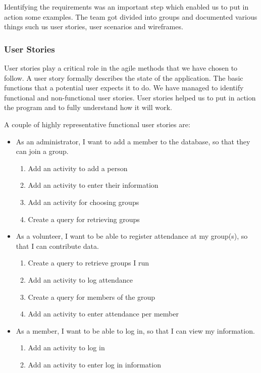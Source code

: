 \documentclass{l3proj}
\begin{document}
Identifying the requirements was an important step which enabled us to put in action some examples. The team got divided into groups and documented various things such us user stories, user scenarios and wireframes. 

\subsubsection{User Stories}
\label{user_stories}

User stories play a critical role in the agile methods that we have chosen to follow. A user story formally describes the state of the application. The basic functions that a potential user expects it to do. We have managed to identify functional and non-functional user stories. User stories helped us to put in action the program and to fully understand how it will work.

A couple of highly representative functional user stories are:
\begin{itemize}

\item As an administrator, I want to add a member to the database, so that they can join a group.

	\begin{enumerate}
  	\item Add an activity to add a person
  	
	\item Add an activity to enter their information

	\item Add an activity for choosing groups

	\item Create a query for retrieving groups
	\end{enumerate}
\item As a volunteer, I want to be able to register attendance at my group(s), so that I can contribute data.

	\begin{enumerate}
	\item Create a query to retrieve groups I run
	
	\item Add an activity to log attendance
	
	\item Create a query for members of the group
	
	\item Add an activity to enter attendance per member
	
	\end{enumerate}

\item As a member, I want to be able to log in, so that I can view my information.

	\begin{enumerate}
	
	\item Add an activity to log in
	\item Add an activity to enter log in information
	
	\end{enumerate}

\end{itemize}
\end{document}
